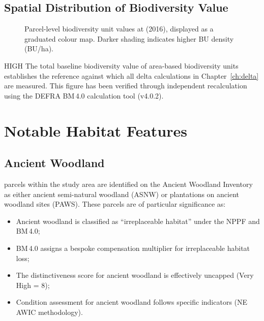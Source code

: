 \subsection{Spatial Distribution of Biodiversity Value}

\begin{figure}[H]
\centering
{}
\caption{Parcel-level biodiversity unit values at \Tzero{} (2016), displayed as a graduated colour map. Darker shading indicates higher BU density (BU/ha).}
\label{fig:bu-choropleth-2016}
\end{figure}

\begin{confidencebox}{HIGH}
The total baseline biodiversity value of  area-based biodiversity units establishes the reference against which all delta calculations in Chapter~\ref{ch:delta} are measured. This figure has been verified through independent recalculation using the DEFRA BM\,4.0 calculation tool (v4.0.2).
\end{confidencebox}


\section{Notable Habitat Features}

\subsection{Ancient Woodland}

 parcels within the study area are identified on the Ancient Woodland Inventory as either ancient semi-natural woodland (ASNW) or plantations on ancient woodland sites (PAWS). These parcels are of particular significance as:

\begin{itemize}[nosep]
  \item Ancient woodland is classified as ``irreplaceable habitat'' under the NPPF and BM\,4.0;
  \item BM\,4.0 assigns a bespoke compensation multiplier for irreplaceable habitat loss;
  \item The distinctiveness score for ancient woodland is effectively uncapped (Very High = 8);
  \item Condition assessment for ancient woodland follows specific indicators (NE AWIC methodology).
\end{itemize}


